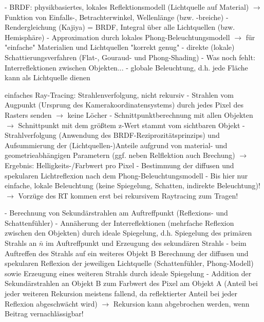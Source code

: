\documentclass[10pt,landscape]{article}
\makeatletter
\renewcommand{\section}{\@startsection{section}{1}{0mm}%
                                {-1ex plus -.5ex minus -.2ex}%
                                {0.5ex plus .2ex}%
                                {\normalfont\large\bfseries}}
\renewcommand{\subsection}{\@startsection{subsection}{2}{0mm}%
                                {-1explus -.5ex minus -.2ex}%
                                {0.5ex plus .2ex}%
                                {\normalfont\normalsize\bfseries}}
\makeatother
\begin{document}
\begin{multicols}{3}
  - BRDF: physikbasiertes, lokales Reflektionsmodell (Lichtquelle auf Material) $\rightarrow$ Funktion von Einfalls-, Betrachterwinkel, Wellenlänge (bzw. -breiche)
  - Rendergleichung (Kajiya) = BRDF, Integral über alle Lichtquellen (bzw. Hemisphäre)
  - Approximation durch lokales Phong-Beleuchtungsmodell $\rightarrow$ für "einfache" Materialien und Lichtquellen "korrekt genug"
  - direkte (lokale) Schattierungsverfahren (Flat-, Gouraud- und Phong-Shading)
  - Was noch fehlt: Interreflektionen zwischen Objekten...
  - globale Beleuchtung, d.h. jede Fläche kann als Lichtquelle dienen
  
  einfaches Ray-Tracing: Strahlenverfolgung, nicht rekursiv
  - Strahlen vom Augpunkt (Ursprung des Kamerakoordinatensystems) durch jedes Pixel des Rasters senden $\rightarrow$ keine Löcher
  - Schnittpunktberechnung mit allen Objekten $\rightarrow$ Schnittpunkt mit dem größtem z-Wert stammt vom sichtbaren Objekt
  - Strahlverfolgung (Anwendung des BRDF-Reziprozitätsprinzips) und Aufsummierung der (Lichtquellen-)Anteile aufgrund von material- und geometrieabhängigen Parametern (ggf. neben Relflektion auch Brechung) $\rightarrow$ Ergebnis: Helligkeits-/Farbwert pro Pixel
  - Bestimmung der diffusen und spekularen Lichtreflexion nach dem Phong-Beleuchtungsmodell
  - Bis hier nur einfache, lokale Beleuchtung (keine Spiegelung, Schatten, indirekte Beleuchtung)! $\rightarrow$ Vorzüge des RT kommen erst bei rekursivem Raytracing zum Tragen!
  
  
  - Berechnung von Sekundärstrahlen am Auftreffpunkt (Reflexions- und Schattenfühler)
  - Annäherung der Interreflektionen (mehrfache Reflexion zwischen den Objekten) durch ideale Spiegelung, d.h. Spiegelung des primären Strahls an $\bar{n}$ im Auftreffpunkt und Erzeugung des sekundären Strahls
  - beim Auftreffen des Strahls auf ein weiteres Objekt B Berechnung der diffusen und spekularen Reflexion der jeweiligen Lichtquelle (Schattenfühler, Phong-Modell) sowie Erzeugung eines weiteren Strahls durch ideale Spiegelung
  - Addition der Sekundärstrahlen an Objekt B zum Farbwert des Pixel am Objekt A (Anteil bei jeder weiteren Rekursion meistens fallend, da reflektierter Anteil bei jeder Reflexion abgeschwächt wird) $\rightarrow$ Rekursion kann abgebrochen werden, wenn Beitrag vernachlässigbar!
  

\end{multicols}
\end{document}
